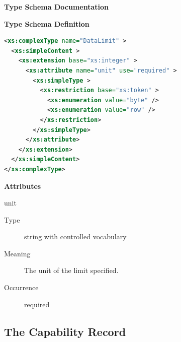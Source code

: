 \documentclass{ivoa}
\begin{document}
\endgroup

\begingroup
      	\renewcommand*\descriptionlabel[1]{%
      	\hbox to 5.5em{\emph{#1}\hfil}}
      	\vspace{2ex}\noindent\textbf{ Type Schema Documentation}


\vspace{1ex}\noindent\textbf{ Type Schema Definition}

\begin{lstlisting}[language=XML,basicstyle=\footnotesize]
<xs:complexType name="DataLimit" >
  <xs:simpleContent >
    <xs:extension base="xs:integer" >
      <xs:attribute name="unit" use="required" >
        <xs:simpleType >
          <xs:restriction base="xs:token" >
            <xs:enumeration value="byte" />
            <xs:enumeration value="row" />
          </xs:restriction>
        </xs:simpleType>
      </xs:attribute>
    </xs:extension>
  </xs:simpleContent>
</xs:complexType>
\end{lstlisting}

\vspace{0.5ex}\noindent\textbf{ Attributes}

\begingroup\small\begin{bigdescription}
\item[unit]
\begin{description}
\item[Type] string with controlled vocabulary
\item[Meaning] 
            The unit of the limit specified.
            
\item[Occurrence] required




\end{description}


\end{bigdescription}\endgroup

\endgroup

\subsection{The Capability Record}
\end{document}
